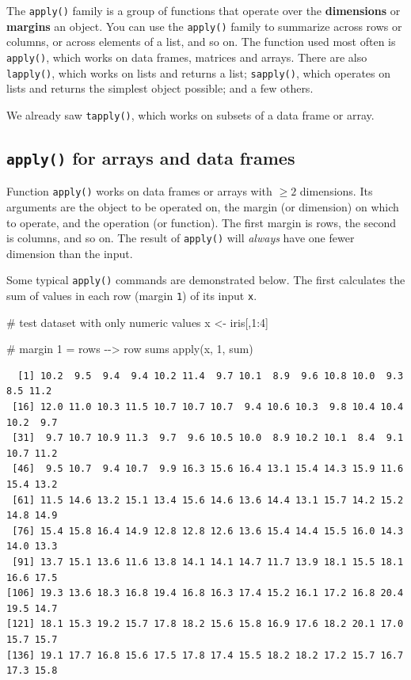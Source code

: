 \documentclass[
  13,
  letterpaper,
]{report}
\newenvironment{Shaded}{\begin{snugshade}}{\end{snugshade}}
\newcommand{\CommentTok}[1]{\textcolor[rgb]{0.37,0.37,0.37}{#1}}
\newcommand{\DecValTok}[1]{\textcolor[rgb]{0.68,0.00,0.00}{#1}}
\newcommand{\FunctionTok}[1]{\textcolor[rgb]{0.28,0.35,0.67}{#1}}
\newcommand{\NormalTok}[1]{\textcolor[rgb]{0.00,0.23,0.31}{#1}}
\newcommand{\OtherTok}[1]{\textcolor[rgb]{0.00,0.23,0.31}{#1}}
\newcommand{\SpecialCharTok}[1]{\textcolor[rgb]{0.37,0.37,0.37}{#1}}
\begin{document}
The \texttt{apply()} family is a group of functions that operate over
the \textbf{dimensions} or \textbf{margins} an object. You can use the
\texttt{apply()} family to summarize across rows or columns, or across
elements of a list, and so on. The function used most often is
\texttt{apply()}, which works on data frames, matrices and arrays. There
are also \texttt{lapply()}, which works on lists and returns a list;
\texttt{sapply()}, which operates on lists and returns the simplest
object possible; and a few others.

We already saw \texttt{tapply()}, which works on subsets of a data frame
or array.

\subsection{\texorpdfstring{\texttt{apply()} for arrays and data
frames}{apply() for arrays and data frames}}\label{apply-for-arrays-and-data-frames}

Function \texttt{apply()} works on data frames or arrays with \(\ge2\)
dimensions. Its arguments are the object to be operated on, the margin
(or dimension) on which to operate, and the operation (or function). The
first margin is rows, the second is columns, and so on. The result of
\texttt{apply()} will \emph{always} have one fewer dimension than the
input.

Some typical \texttt{apply()} commands are demonstrated below. The first
calculates the sum of values in each row (margin \texttt{1}) of its
input \texttt{x}.

\begin{Shaded}
\begin{Highlighting}[]
\CommentTok{\# test dataset with only numeric values}
\NormalTok{x }\OtherTok{\textless{}{-}}\NormalTok{ iris[,}\DecValTok{1}\SpecialCharTok{:}\DecValTok{4}\NormalTok{]}

\CommentTok{\# margin 1 = rows {-}{-}\textgreater{} row sums}
\FunctionTok{apply}\NormalTok{(x, }\DecValTok{1}\NormalTok{, sum)}
\end{Highlighting}
\end{Shaded}

\begin{verbatim}
  [1] 10.2  9.5  9.4  9.4 10.2 11.4  9.7 10.1  8.9  9.6 10.8 10.0  9.3  8.5 11.2
 [16] 12.0 11.0 10.3 11.5 10.7 10.7 10.7  9.4 10.6 10.3  9.8 10.4 10.4 10.2  9.7
 [31]  9.7 10.7 10.9 11.3  9.7  9.6 10.5 10.0  8.9 10.2 10.1  8.4  9.1 10.7 11.2
 [46]  9.5 10.7  9.4 10.7  9.9 16.3 15.6 16.4 13.1 15.4 14.3 15.9 11.6 15.4 13.2
 [61] 11.5 14.6 13.2 15.1 13.4 15.6 14.6 13.6 14.4 13.1 15.7 14.2 15.2 14.8 14.9
 [76] 15.4 15.8 16.4 14.9 12.8 12.8 12.6 13.6 15.4 14.4 15.5 16.0 14.3 14.0 13.3
 [91] 13.7 15.1 13.6 11.6 13.8 14.1 14.1 14.7 11.7 13.9 18.1 15.5 18.1 16.6 17.5
[106] 19.3 13.6 18.3 16.8 19.4 16.8 16.3 17.4 15.2 16.1 17.2 16.8 20.4 19.5 14.7
[121] 18.1 15.3 19.2 15.7 17.8 18.2 15.6 15.8 16.9 17.6 18.2 20.1 17.0 15.7 15.7
[136] 19.1 17.7 16.8 15.6 17.5 17.8 17.4 15.5 18.2 18.2 17.2 15.7 16.7 17.3 15.8
\end{verbatim}
\end{document}
